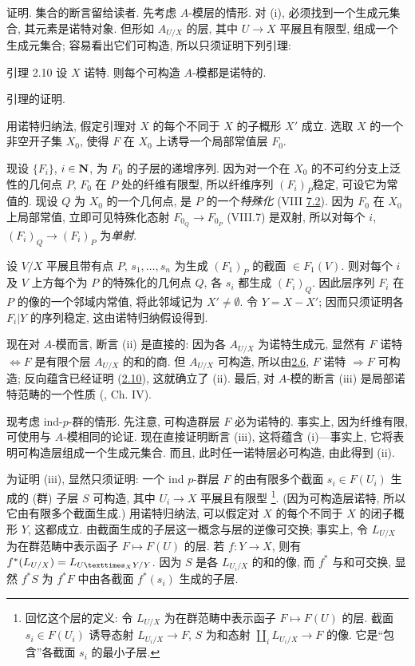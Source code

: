 证明. 集合的断言留给读者.
先考虑 $A$-模层的情形.
对 (i), 必须找到一个生成元集合, 其元素是诺特对象.
但形如 $A_{U/X}$ 的层, 其中 $U\rightarrow X$ 平展且有限型,
组成一个生成元集合; 容易看出它们可构造,
所以只须证明下列引理:

\begin{enonce*}{引理 2.10}
设 $X$ 诺特. 则每个可构造 $A$-模都是诺特的.
\end{enonce*}

引理的证明.

用诺特归纳法, 假定引理对 $X$ 的每个不同于 $X$ 的子概形 $X'$ 成立.
选取 $X$ 的一个非空开子集 $X_0$,
使得 $F$ 在 $X_0$ 上诱导一个局部常值层 $F_0$.

现设 $\{F_i\}$, $i\in \mathbf{N}$, 为 $F_0$ 的子层的递增序列.
因为对一个在 $X_0$ 的不可约分支上泛性的几何点 $P$,
$F_0$ 在 $P$ 处的纤维有限型,
所以纤维序列 $(F_i)_P$\pageoriginale 稳定, 可设它为常值的.
现设 $Q$ 为 $X_0$ 的一个几何点, 是 $P$ 的一个\emph{特殊化}
(VIII \hyperref[VIII.def7.2]{7.2}).
因为 $F_0$ 在 $X_0$ 上局部常值,
立即可见特殊化态射 $F_{0_Q}\rightarrow F_{0_P}$ (VIII.7) 是双射,
所以对每个 $i$, $(F_i)_Q\rightarrow (F_i)_P$ 为\emph{单射}.

设 $V/X$ 平展且带有点 $P$,
$s_1,\ldots,s_n$ 为生成 $(F_1)_P$ 的截面 $\in F_1(V)$.
则对每个 $i$ 及 $V$ 上方每个为 $P$ 的特殊化的几何点 $Q$,
各 $s_i$ 都生成 $(F_i)_Q$.
因此层序列 $F_i$ 在 $P$ 的像的一个邻域内常值, 将此邻域记为 $X'\neq ∅$.
令 $Y=X-X'$; 因而只须证明各 $F_i| Y$ 的序列稳定,
这由诺特归纳假设得到.

现在对 $A$-模而言, 断言 (ii) 是直接的:
因为各 $A_{U/X}$ 为诺特生成元, 显然有
$F$ 诺特 $\Leftrightarrow F$ 是有限个层 $A_{U/X}$ 的和的商.
但 $A_{U/X}$ 可构造, 所以由\hyperref[IX.prop2.6]{2.6},
$F$ 诺特 $\Rightarrow F$ 可构造;
反向蕴含已经证明 (\hyperref[IX.lem2.10]{2.10}), 这就确立了 (ii).
最后, 对 $A$-模的断言 (iii) 是局部诺特范畴的一个性质 (\cf [1], Ch. IV).

现考虑 ind-$p$-群的情形.
先注意, 可构造群层 $F$ 必为诺特的.
事实上, 因为纤维有限, 可使用与 $A$-模相同的论证.
现在直接证明断言 (iii), 这将蕴含 (i)---事实上,
它将表明可构造层组成一个生成元集合.
而且, 此时任一诺特层必可构造, 由此得到 (ii).

为证明 (iii), 显然只须证明:
一个 ind $p$-群层 $F$ 的由有限多个截面 $s_i\in F(U_i)$
生成的 (群) 子层 $S$ 可构造, 其中 $U_i\rightarrow X$ 平展且有限型
\footnote[1]{回忆这个层的定义:
令 $L_{U/X}$ 为在群范畴中表示函子 $F\mapsto F(U)$ 的层.
截面 $s_i\in F(U_i)$ 诱导态射 $L_{U_i/X}\rightarrow F$,
$S$ 为和态射 $\amalg_i L_{U_i/X}\rightarrow F$ 的像.
它是“包含”各截面 $s_i$ 的最小子层.}.
(因为\pageoriginale 可构造层诺特, 所以它由有限多个截面生成.)
用诺特归纳法, 可以假定对 $X$ 的每个不同于 $X$ 的闭子概形 $Y$, 这都成立.
由截面生成的子层这一概念与层的逆像可交换;
事实上, 令 $L_{U/X}$ 为在群范畴中表示函子 $F\mapsto F(U)$ 的层.
若 $f:Y\rightarrow X$, 则有 $f^{\ast}(L_{U/X})=L_{\fprod{U}{Y}{X}/Y}$.
因为 $S$ 是各 $L_{U_i/X}$ 的和的像, 而 $f^{\ast}$ 与和可交换,
显然 $f^{\ast}S$ 为 $f^{\ast}F$ 中由各截面 $f^{\ast}(s_i)$ 生成的子层.

